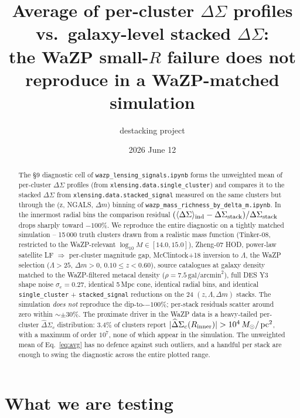 \documentclass[11pt,a4paper]{article}
\title{\textbf{Average of per-cluster $\Delta\Sigma$ profiles vs.\
galaxy-level stacked $\Delta\Sigma$:\\
the WaZP small-$R$ failure does not reproduce in a
WaZP-matched simulation}}
\author{destacking project}
\date{2026 June 12}
\newcommand{\DS}{\Delta\Sigma}
\newcommand{\Msun}{M_{\odot}}
\newcommand{\pc}{\,\mathrm{pc}}
\begin{document}
\maketitle

\begin{abstract}
The §9 diagnostic cell of \verb|wazp_lensing_signals.ipynb| forms the
unweighted mean of per-cluster $\DS$ profiles (from
\verb|xlensing.data.single_cluster|) and compares it to the stacked
$\DS$ from \verb|xlensing.data.stacked_signal| measured on the same
clusters but through the (z, NGALS, $\Delta m$) binning of
\verb|wazp_mass_richness_by_delta_m.ipynb|.  In the innermost radial
bins the comparison residual
$(\langle\DS\rangle_{\rm ind} - \DS_{\rm stack})/\DS_{\rm stack}$
drops sharply toward $-100\%$.  We reproduce the entire diagnostic on
a tightly matched simulation -- 15\,000 truth clusters drawn from a
realistic mass function (Tinker-08, restricted to the WaZP-relevant
$\log_{10} M \in [14.0, 15.0]$), Zheng-07 HOD, power-law satellite LF
$\Rightarrow$ per-cluster magnitude gap, McClintock+18 inversion to
$\Lambda$, the WaZP selection ($\Lambda > 25$, $\Delta m > 0$,
$0.10 \le z < 0.60$), source catalogues at galaxy density matched to
the WaZP-filtered metacal density ($\rho = 7.5\,
\mathrm{gal}/\mathrm{arcmin}^{2}$), full DES Y3 shape noise
$\sigma_{e} = 0.27$, identical 5\,Mpc cone, identical radial bins, and
identical \verb|single_cluster| + \verb|stacked_signal| reductions on
the 24 $(z, \Lambda, \Delta m)$ stacks.  The simulation \emph{does
not} reproduce the dip-to-$-100\%$; per-stack residuals scatter around
zero within $\sim\pm 30\%$.  The proximate driver in the WaZP data is
a heavy-tailed per-cluster $\widehat\DS_c$ distribution: $3.4\%$ of
clusters report $|\widehat\DS_c(R_{\rm inner})| > 10^{4}\,
\Msun/\pc^{2}$, with a maximum of order $10^{7}$, none of which appear
in the simulation.  The unweighted mean of Eq.~\eqref{eq:avg} has no
defence against such outliers, and a handful per stack are enough to
swing the diagnostic across the entire plotted range.
\end{abstract}

\tableofcontents
\bigskip


\section{What we are testing}
\label{sec:test}
\end{document}
